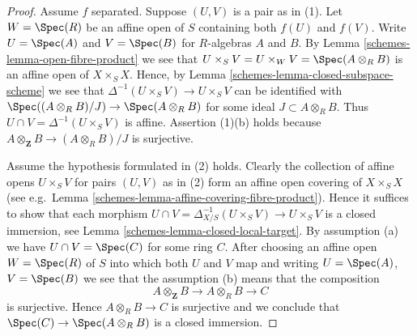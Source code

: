 \begin{proof}

Assume $f$ separated. Suppose $(U, V)$ is a pair as in (1).
Let $W = \Spec(R)$ be an affine open of $S$ containing
both $f(U)$ and $f(V)$. Write $U = \Spec(A)$ and
$V = \Spec(B)$ for $R$-algebras $A$ and $B$.
By Lemma \ref{schemes-lemma-open-fibre-product} we see that
$U \times_S V = U \times_W V = \Spec(A \otimes_R B)$
is an affine open of $X \times_S X$. Hence, by
Lemma \ref{schemes-lemma-closed-subspace-scheme} we see that
$\Delta^{-1}(U \times_S V) \to U \times_S V$
can be identified with $\Spec((A \otimes_R B)/J) \to \Spec(A \otimes_R B)$
for some ideal $J \subset A \otimes_R B$.
Thus $U \cap V = \Delta^{-1}(U \times_S V)$ is affine.
Assertion (1)(b) holds because
$A \otimes_{\mathbf{Z}} B \to (A \otimes_R B)/J$ is surjective.

\medskip\noindent
Assume the hypothesis formulated in (2) holds.
Clearly the collection of affine opens $U \times_S V$
for pairs $(U, V)$ as in (2) form an affine open covering
of $X \times_S X$ (see e.g.\ Lemma \ref{schemes-lemma-affine-covering-fibre-product}).
Hence it suffices to show that each morphism
$U \cap V = \Delta_{X/S}^{-1}(U \times_S V) \to U \times_S V$
is a closed immersion, see Lemma \ref{schemes-lemma-closed-local-target}.
By assumption (a) we have $U \cap V = \Spec(C)$ for some ring $C$.
After choosing an affine open $W = \Spec(R)$ of $S$
into which both $U$ and $V$ map and writing $U = \Spec(A)$,
$V = \Spec(B)$ we see that the assumption (b) means
that the composition
$$
A \otimes_{\mathbf{Z}} B \to A \otimes_R B \to C
$$
is surjective. Hence $A \otimes_R B \to C$ is surjective and
we conclude that $\Spec(C) \to \Spec(A \otimes_R B)$
is a closed immersion.
\end{proof}

